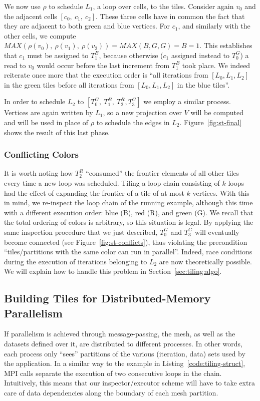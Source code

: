 We now use $\rho$ to schedule $L_1$, a loop over cells, to the tiles. Consider again $v_0$ and the adjacent cells $[c_0,\ c_1,\ c_2]$. These three cells have in common the fact that they are adjacent to both green and blue vertices. For $c_1$, and similarly with the other cells, we compute $MAX(\rho(v_0),\ \rho(v_1),\ \rho(v_2)) = MAX(B, G, G) = B = 1$. This establishes that $c_1$ must be assigned to $T_1^B$, because otherwise ($c_1$ assigned instead to $T_0^G$) a read to $v_0$ would occur before the last increment from $T_1^B$ took place. We indeed reiterate once more that the execution order is ``all iterations from $[L_0, L_1, L_2]$ in the green tiles before all iterations from $[L_0, L_1, L_2]$ in the blue tiles''.

In order to schedule $L_2$ to $[T_0^G,\ T_1^B,\ T_2^R, T_3^G]$ we employ a similar process. Vertices are again written by $L_1$, so a new projection over $V$ will be computed and will be used in place of $\rho$ to schedule the edges in $L_2$. Figure~\ref{fig:st-final} shows the result of this last phase. 

\subsubsection*{Conflicting Colors}
It is worth noting how $T_2^R$ ``consumed'' the frontier elements of all other tiles every time a new loop was scheduled. Tiling a loop chain consisting of $k$ loops had the effect of expanding the frontier of a tile of at most $k$ vertices. With this in mind, we re-inspect the loop chain of the running example, although this time with a different execution order: blue (B), red (R), and green (G). We recall that the total ordering of colors is arbitrary, so this situation is legal. By applying the same inspection procedure that we just described, $T_0^G$ and $T_3^G$ will eventually become connected (see Figure~\ref{fig:st-conflicts}), thus violating the precondition ``tiles/partitions with the same color can run in parallel''. Indeed, race conditions during the execution of iterations belonging to $L_2$ are now theoretically possible. We will explain how to handle this problem in Section~\ref{sec:tiling:algo}.

\subsection{Building Tiles for Distributed-Memory Parallelism}
If parallelism is achieved through message-passing, the mesh, as well as the datasets defined over it, are distributed to different processes. In other words, each process only ``sees'' partitions of the various (iteration, data) sets used by the application. In a similar way to the example in Listing~\ref{code:tiling-struct}, MPI calls separate the execution of two consecutive loops in the chain. Intuitively, this means that our inspector/executor scheme will have to take extra care of data dependencies along the boundary of each mesh partition.


